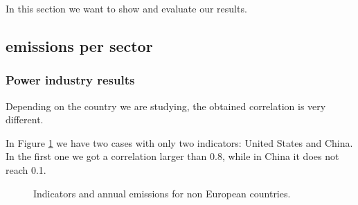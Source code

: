 
In this section we want to show and evaluate our results.

\subsection{\co emissions per sector}

\subsubsection{Power industry results}
Depending on the country we are studying, the obtained correlation is very different. 

In Figure \ref{fig:indicators_EEUU_China} we have two cases with only two indicators: United States and China. In the first one we got a correlation larger than 0.8, while in China it does not reach 0.1.
\begin{figure}[h!]
	\centering
	\caption{Indicators and annual emissions for non European countries.}
	\label{fig:indicators_EEUU_China}
\end{figure}

